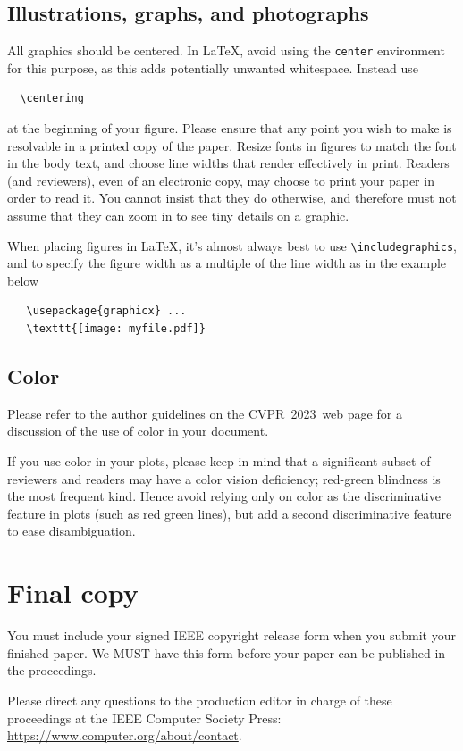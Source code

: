 \documentclass[10pt,twocolumn,letterpaper]{article}
\def\confName{CVPR}
\def\confYear{2023}
\begin{document}
\subsection{Illustrations, graphs, and photographs}

All graphics should be centered.
In \LaTeX, avoid using the \texttt{center} environment for this purpose, as this adds potentially unwanted whitespace.
Instead use
{\small\begin{verbatim}
  \centering
\end{verbatim}}
at the beginning of your figure.
Please ensure that any point you wish to make is resolvable in a printed copy of the paper.
Resize fonts in figures to match the font in the body text, and choose line widths that render effectively in print.
Readers (and reviewers), even of an electronic copy, may choose to print your paper in order to read it.
You cannot insist that they do otherwise, and therefore must not assume that they can zoom in to see tiny details on a graphic.

When placing figures in \LaTeX, it's almost always best to use \verb+\includegraphics+, and to specify the figure width as a multiple of the line width as in the example below
{\small\begin{verbatim}
   \usepackage{graphicx} ...
   \texttt{[image: myfile.pdf]}
\end{verbatim}
}


\subsection{Color}

Please refer to the author guidelines on the \confName\ \confYear\ web page for a discussion of the use of color in your document.

If you use color in your plots, please keep in mind that a significant subset of reviewers and readers may have a color vision deficiency; red-green blindness is the most frequent kind.
Hence avoid relying only on color as the discriminative feature in plots (such as red \vs green lines), but add a second discriminative feature to ease disambiguation.

\section{Final copy}

You must include your signed IEEE copyright release form when you submit your finished paper.
We MUST have this form before your paper can be published in the proceedings.

Please direct any questions to the production editor in charge of these proceedings at the IEEE Computer Society Press:
\url{https://www.computer.org/about/contact}.


{\small


}
\end{document}
